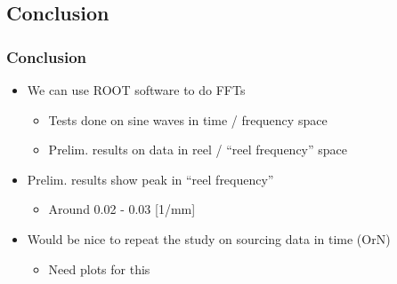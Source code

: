 \documentclass[bigger]{beamer}
\begin{document}
\subsection{Conclusion}
\label{sec-4-1}
\begin{frame}
\frametitle{Conclusion}
\label{sec-4-1-1}
\begin{itemize}

\item We can use ROOT software to do FFTs
\label{sec-4-1-1-1}%
\begin{itemize}

\item Tests done on sine waves in time / frequency space
\label{sec-4-1-1-1-1}%

\item Prelim. results on data in reel / ``reel frequency'' space
\label{sec-4-1-1-1-2}%
\end{itemize} %

\item Prelim. results show peak in ``reel frequency''
\label{sec-4-1-1-2}%
\begin{itemize}

\item Around 0.02 - 0.03 [1/mm]
\label{sec-4-1-1-2-1}%
\end{itemize} %

\item Would be nice to repeat the study on sourcing data in time (OrN)
\label{sec-4-1-1-3}%
\begin{itemize}

\item Need plots for this
\label{sec-4-1-1-3-1}%
\end{itemize} %
\end{itemize} %
\end{frame}
\end{document}
